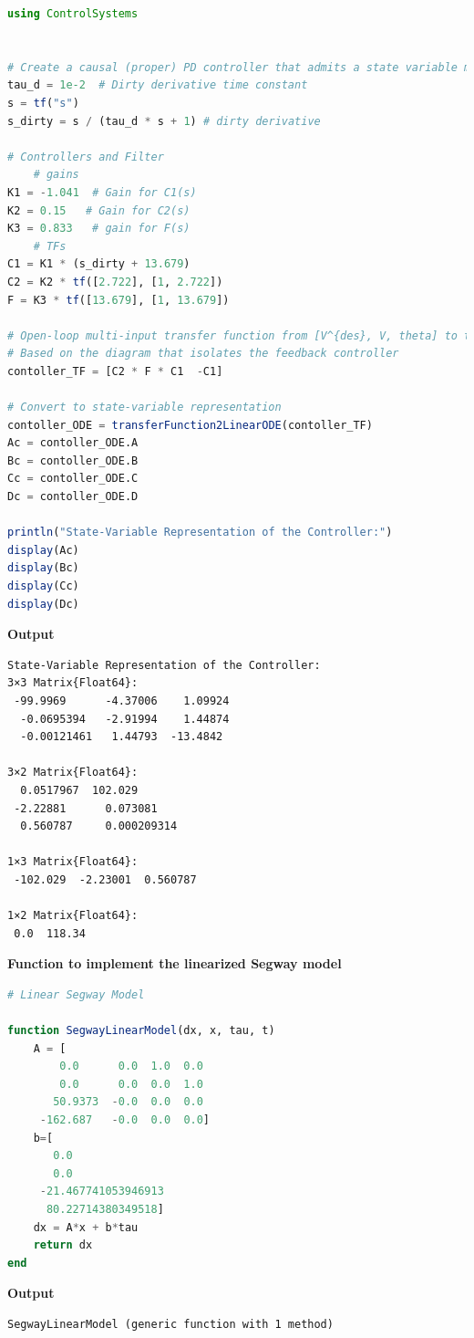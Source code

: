 \begin{lstlisting}[language=Julia,style=mystyle]
using ControlSystems


# Create a causal (proper) PD controller that admits a state variable model 
tau_d = 1e-2  # Dirty derivative time constant
s = tf("s")
s_dirty = s / (tau_d * s + 1) # dirty derivative

# Controllers and Filter
    # gains
K1 = -1.041  # Gain for C1(s)
K2 = 0.15   # Gain for C2(s)
K3 = 0.833   # gain for F(s)
    # TFs
C1 = K1 * (s_dirty + 13.679) 
C2 = K2 * tf([2.722], [1, 2.722]) 
F = K3 * tf([13.679], [1, 13.679])

# Open-loop multi-input transfer function from [V^{des}, V, theta] to tau
# Based on the diagram that isolates the feedback controller
contoller_TF = [C2 * F * C1  -C1]

# Convert to state-variable representation
contoller_ODE = transferFunction2LinearODE(contoller_TF)
Ac = contoller_ODE.A
Bc = contoller_ODE.B
Cc = contoller_ODE.C
Dc = contoller_ODE.D

println("State-Variable Representation of the Controller:")
display(Ac)
display(Bc)
display(Cc)
display(Dc)
\end{lstlisting}
\textbf{Output} 
\begin{verbatim}
State-Variable Representation of the Controller:
3×3 Matrix{Float64}:
 -99.9969      -4.37006    1.09924
  -0.0695394   -2.91994    1.44874
  -0.00121461   1.44793  -13.4842
  
3×2 Matrix{Float64}:
  0.0517967  102.029
 -2.22881      0.073081
  0.560787     0.000209314
  
1×3 Matrix{Float64}:
 -102.029  -2.23001  0.560787
 
1×2 Matrix{Float64}:
 0.0  118.34
\end{verbatim}

\textbf{Function to implement the linearized Segway model}
\begin{lstlisting}[language=Julia,style=mystyle]
# Linear Segway Model

function SegwayLinearModel(dx, x, tau, t)
    A = [
        0.0      0.0  1.0  0.0
        0.0      0.0  0.0  1.0
       50.9373  -0.0  0.0  0.0
     -162.687   -0.0  0.0  0.0]
    b=[
       0.0
       0.0
     -21.467741053946913
      80.22714380349518]
    dx = A*x + b*tau
    return dx
end
\end{lstlisting}
\textbf{Output} 
\begin{verbatim}
SegwayLinearModel (generic function with 1 method)
\end{verbatim}

